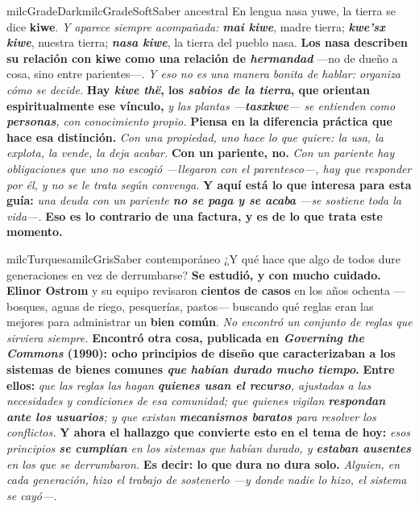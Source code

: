 \documentclass[11pt,letterpaper]{article}
\begin{document}
\begin{softbox}{milcGradeDark}{milcGradeSoft}{Saber ancestral}
En lengua nasa yuwe, la tierra se dice \textbf{kiwe}. \emph{Y aparece siempre acompañada:} \textbf{\emph{mai kiwe}}, madre tierra; \textbf{\emph{kwe'sx kiwe}}, nuestra tierra; \textbf{\emph{nasa kiwe}}, la tierra del pueblo nasa. \textbf{Los nasa describen su relación con kiwe como una relación de \emph{hermandad}} ---no de dueño a cosa, sino entre parientes---. \emph{Y eso no es una manera bonita de hablar: organiza cómo se decide.} \textbf{Hay \emph{kiwe thë}, los \emph{sabios de la tierra}, que orientan espiritualmente ese vínculo,} \emph{y las plantas ---\textbf{tasxkwe}--- se entienden como \textbf{personas}, con conocimiento propio.} \textbf{Piensa en la diferencia práctica que hace esa distinción.} \emph{Con una propiedad, uno hace lo que quiere: la usa, la explota, la vende, la deja acabar.} \textbf{Con un pariente, no.} \emph{Con un pariente hay obligaciones que uno no escogió ---llegaron con el parentesco---, hay que responder por él, y no se le trata según convenga.} \textbf{Y aquí está lo que interesa para esta guía:} \emph{una deuda con un pariente \textbf{no se paga y se acaba} ---se sostiene toda la vida---.} \textbf{Eso es lo contrario de una factura, y es de lo que trata este momento.}
\end{softbox}

\begin{softbox}{milcTurquesa}{milcGris}{Saber contemporáneo}
¿Y qué hace que algo de todos dure generaciones en vez de derrumbarse? \textbf{Se estudió, y con mucho cuidado.} \textbf{Elinor Ostrom} y su equipo revisaron \textbf{cientos de casos} en los años ochenta ---bosques, aguas de riego, pesquerías, pastos--- buscando qué reglas eran las mejores para administrar un \textbf{bien común}. \emph{No encontró un conjunto de reglas que sirviera siempre.} \textbf{Encontró otra cosa, publicada en \emph{Governing the Commons} (1990): \textbf{ocho principios de diseño} que caracterizaban a los sistemas de bienes comunes \emph{que habían durado mucho tiempo}.} \textbf{Entre ellos:} \emph{que las reglas las hagan \textbf{quienes usan el recurso}, ajustadas a las necesidades y condiciones de esa comunidad; que quienes vigilan \textbf{respondan ante los usuarios}; y que existan \textbf{mecanismos baratos} para resolver los conflictos.} \textbf{Y ahora el hallazgo que convierte esto en el tema de hoy:} \emph{esos principios \textbf{se cumplían} en los sistemas que habían durado, y \textbf{estaban ausentes} en los que se derrumbaron.} \textbf{Es decir: lo que dura no dura solo.} \emph{Alguien, en cada generación, hizo el trabajo de sostenerlo ---y donde nadie lo hizo, el sistema se cayó---.}
\end{softbox}
\end{document}
